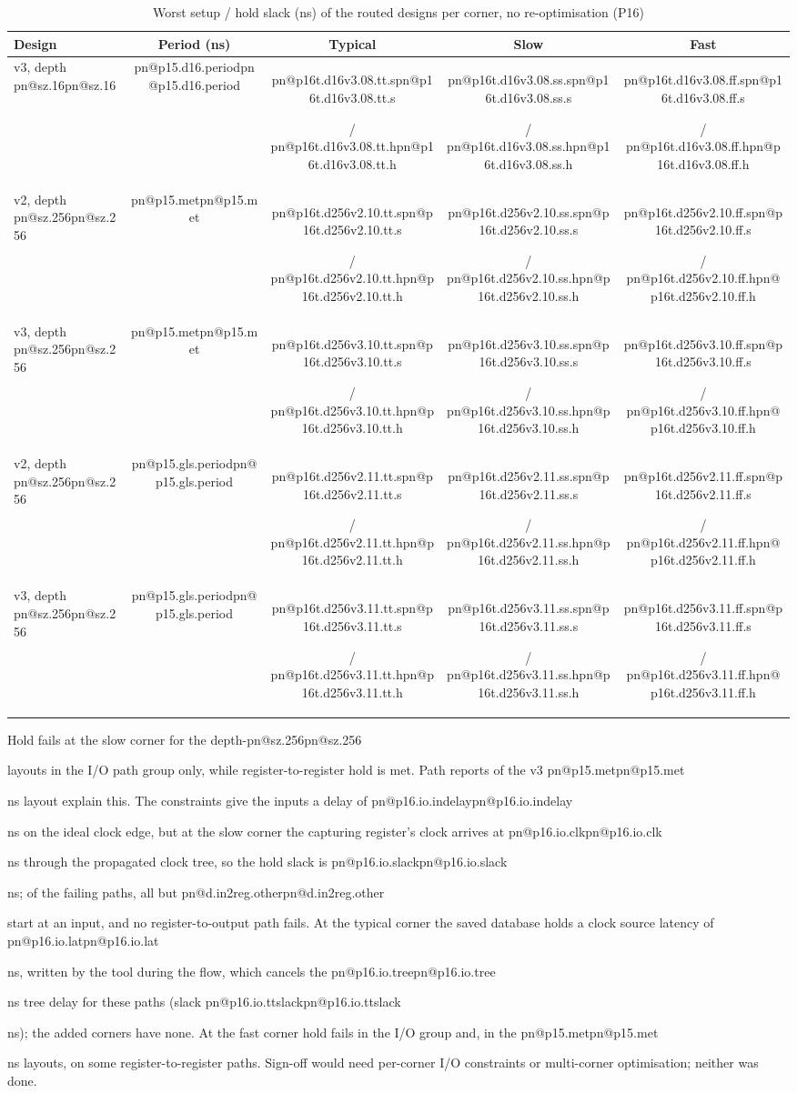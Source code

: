 \documentclass[11pt,a4paper]{report}
\makeatletter
\DeclareRobustCommand{\R}[1]{\ifcsname pn@#1\endcsname\csname pn@#1\endcsname\else
  \PackageError{report}{number key '#1' is not defined in macros.tex}{Run tools/make_paper_macros.py --target report}\fi}
\makeatother
\begin{document}
\begin{table}[ht]
\centering
\caption{Worst setup / hold slack (ns) of the routed designs per corner, no re-optimisation (P16)}
\label{tab:p16}
\begin{tabular}{@{}lcccc@{}}
\toprule
Design & Period (ns) & Typical & Slow & Fast \\
\midrule
v3, depth \R{sz.16} & \R{p15.d16.period} & \R{p16t.d16v3.08.tt.s} / \R{p16t.d16v3.08.tt.h} & \R{p16t.d16v3.08.ss.s} / \R{p16t.d16v3.08.ss.h} & \R{p16t.d16v3.08.ff.s} / \R{p16t.d16v3.08.ff.h} \\
v2, depth \R{sz.256} & \R{p15.met} & \R{p16t.d256v2.10.tt.s} / \R{p16t.d256v2.10.tt.h} & \R{p16t.d256v2.10.ss.s} / \R{p16t.d256v2.10.ss.h} & \R{p16t.d256v2.10.ff.s} / \R{p16t.d256v2.10.ff.h} \\
v3, depth \R{sz.256} & \R{p15.met} & \R{p16t.d256v3.10.tt.s} / \R{p16t.d256v3.10.tt.h} & \R{p16t.d256v3.10.ss.s} / \R{p16t.d256v3.10.ss.h} & \R{p16t.d256v3.10.ff.s} / \R{p16t.d256v3.10.ff.h} \\
v2, depth \R{sz.256} & \R{p15.gls.period} & \R{p16t.d256v2.11.tt.s} / \R{p16t.d256v2.11.tt.h} & \R{p16t.d256v2.11.ss.s} / \R{p16t.d256v2.11.ss.h} & \R{p16t.d256v2.11.ff.s} / \R{p16t.d256v2.11.ff.h} \\
v3, depth \R{sz.256} & \R{p15.gls.period} & \R{p16t.d256v3.11.tt.s} / \R{p16t.d256v3.11.tt.h} & \R{p16t.d256v3.11.ss.s} / \R{p16t.d256v3.11.ss.h} & \R{p16t.d256v3.11.ff.s} / \R{p16t.d256v3.11.ff.h} \\
\bottomrule
\end{tabular}
\end{table}

\enlargethispage{2\baselineskip}Hold fails at the slow corner for the depth-\R{sz.256} layouts in the I/O path group only, while register-to-register hold
is met. Path reports of the v3 \R{p15.met} ns layout explain this. The constraints give the inputs a delay of
\R{p16.io.indelay} ns on the ideal clock edge, but at the slow corner the capturing register's clock arrives at
\R{p16.io.clk} ns through the propagated clock tree, so the hold slack is \R{p16.io.slack} ns; of the failing paths,
all but \R{d.in2reg.other} start at an input, and no register-to-output path fails. At the typical corner the saved
database holds a clock source latency of \R{p16.io.lat} ns, written by the tool during the flow, which cancels the
\R{p16.io.tree} ns tree delay for these paths (slack \R{p16.io.ttslack} ns); the added corners have none. At the fast
corner hold fails in the I/O group and, in the \R{p15.met} ns layouts, on some register-to-register paths. Sign-off would need per-corner I/O constraints or multi-corner optimisation; neither was done.
\end{document}
